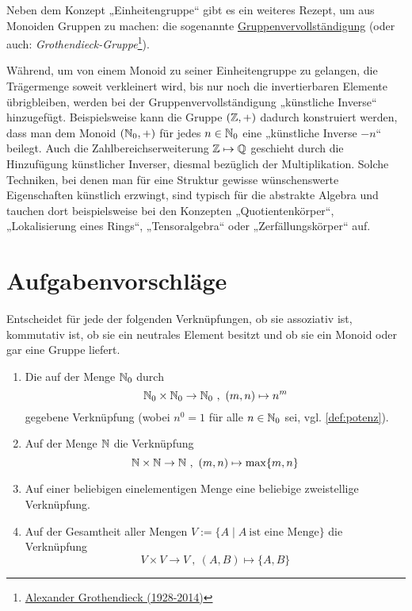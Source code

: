 \begin{vorschau}[* Gruppenvervollständigung] \label{gruppenvervollstaendigung}
    Neben dem Konzept „Einheitengruppe“ gibt es ein weiteres Rezept, um aus Monoiden Gruppen zu machen: die sogenannte \href{https://de.wikipedia.org/wiki/Grothendieck-Gruppe}{Gruppenvervollständigung} (oder auch: \emph{Grothendieck-Gruppe}\footnote{\href{https://de.wikipedia.org/wiki/Alexander_Grothendieck}{Alexander Grothendieck (1928-2014)}}).
    
    Während, um von einem Monoid zu seiner Einheitengruppe zu gelangen, die Trägermenge soweit verkleinert wird, bis nur noch die invertierbaren Elemente übrigbleiben, werden bei der Gruppenvervollständigung „künstliche Inverse“ hinzugefügt. Beispielsweise kann die Gruppe $(\mathbb Z,+)$ dadurch konstruiert werden, dass man dem Monoid $(\mathbb N_0,+)$ für jedes $n\in \mathbb N_0$ eine „künstliche Inverse $-n$“ beilegt. Auch die Zahlbereichserweiterung $\mathbb Z \mapsto \mathbb Q$ geschieht durch die Hinzufügung künstlicher Inverser, diesmal bezüglich der Multiplikation. Solche Techniken, bei denen man für eine Struktur gewisse wünschenswerte Eigenschaften künstlich erzwingt, sind typisch für die abstrakte Algebra und tauchen dort beispielsweise bei den Konzepten „Quotientenkörper“, „Lokalisierung eines Rings“, „Tensoralgebra“ oder „Zerfällungskörper“ auf.
\end{vorschau}





\clearpage
\section{Aufgabenvorschläge}


\begin{aufg} \label{aufg:verknuepfungen}
    Entscheidet für jede der folgenden Verknüpfungen, ob sie assoziativ ist, kommutativ ist, ob sie ein neutrales Element besitzt und ob sie ein Monoid oder gar eine Gruppe liefert.
    \begin{enumerate}
        \item Die auf der Menge $\mathbb N_0$ durch
            \[ \mathbb N_0 \times \mathbb N_0 \to \mathbb N_0 \ ,\ (m,n) \mapsto n^m \]
        gegebene Verknüpfung (wobei $n^0=1$ für alle $n\in \mathbb N_0$ sei, vgl. \cref{def:potenz}).
        \item Auf der Menge $\mathbb N$ die Verknüpfung
            \[ \mathbb N \times \mathbb N \to \mathbb N \ ,\ (m,n) \mapsto \max \{m,n\} \]
        \item Auf einer beliebigen einelementigen Menge eine beliebige zweistellige Verknüpfung.
        \item Auf der Gesamtheit aller Mengen $V:=\{A\mid A\ \text{ist eine Menge}\}$ die Verknüpfung
            \[ V\times V\to V \ ,\ (A,B) \mapsto \{A,B\} \]
    \end{enumerate}
\end{aufg}


